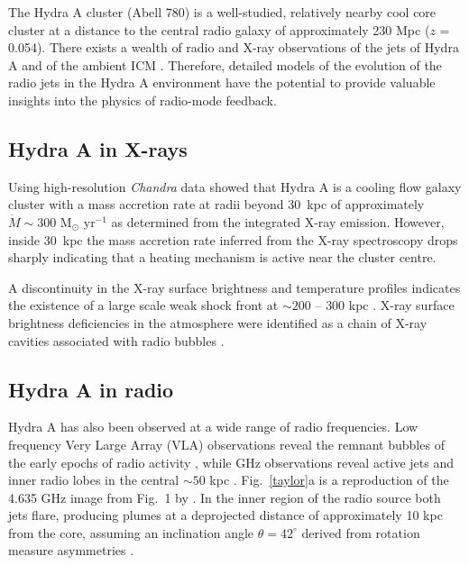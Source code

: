 The Hydra A cluster (Abell 780) is a well-studied, relatively nearby cool core cluster at a distance to the central radio galaxy of approximately 230 Mpc ($z$ = 0.054). There exists a wealth of radio and X-ray observations of the jets of Hydra A and of the ambient ICM \citep{taylor90, mcnamara00, david01}. Therefore, detailed models of the evolution of the radio jets in the Hydra A environment have the potential to provide valuable insights into the physics of radio-mode feedback.

\subsection{Hydra A in X-rays}
Using high-resolution \textit{Chandra} data \citet{david01} showed that Hydra A is a cooling flow galaxy cluster with a mass accretion rate at radii beyond 30~kpc of approximately $\dot{M}\sim300$ M$_{\odot}$ yr$^{-1}$ as determined from the integrated  X-ray emission. However, inside 30~kpc the mass accretion rate inferred from the X-ray spectroscopy drops sharply indicating that a heating mechanism is active near the cluster centre.


A discontinuity in the X-ray surface brightness and temperature profiles indicates the existence of a large scale weak shock front at $\sim200$ -- $300$ kpc \citep{nulsen05}. X-ray surface brightness deficiencies in the atmosphere were identified as a chain of X-ray cavities associated with radio bubbles \citep{wise07}.

\subsection{Hydra A in radio}
Hydra A has also been observed at a wide range of radio frequencies. Low frequency Very Large Array (VLA) observations reveal the remnant bubbles of the early epochs of radio activity \citep{lane04}, while GHz observations reveal active jets and inner radio lobes in the central $\sim50$ kpc \citep{taylor90}.
Fig.~\ref{taylor}a is a reproduction of the 4.635 GHz image from Fig.~1 by \citet{taylor90}. In the inner region of the radio source both jets flare, producing plumes at a deprojected distance of approximately 10 kpc from the core, assuming an inclination angle $\theta=42^\circ$ derived from rotation measure asymmetries \citep{taylor90,taylor93}.

